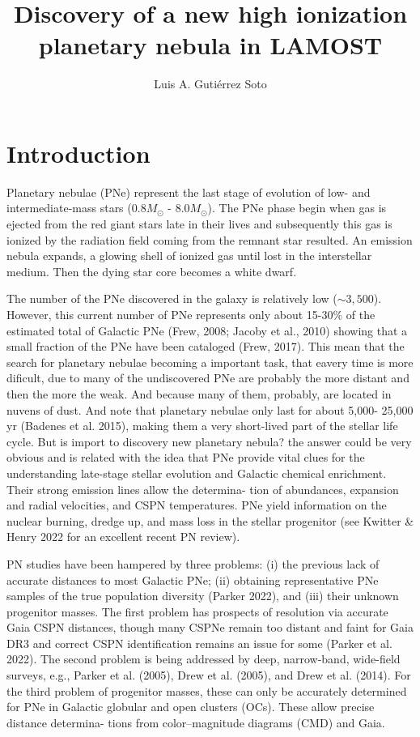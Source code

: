 \documentclass{article}
\title{Discovery of a new high  ionization planetary nebula in LAMOST}
\author{Luis A. Gutiérrez Soto     
}
\newcommand\msol{M_\odot}
\begin{document}
\maketitle

\section{Introduction}
\label{sec:intro}

Planetary nebulae (PNe) represent the last stage of evolution of low- and intermediate-mass stars (0.8$\msol$ - 8.0$\msol$). The PNe phase begin when gas is ejected from the red giant stars late in their lives and subsequently this gas is ionized by the radiation field coming from the remnant star resulted. An emission nebula expands, a glowing shell of ionized gas until lost in the interstellar medium. Then the dying star core becomes a white dwarf.

The number of the PNe discovered in the galaxy is relatively low (\(\sim 3,500\)). However, this current number of PNe represents only about 15-30\% of the estimated
total of Galactic PNe (Frew, 2008; Jacoby et al., 2010) showing that a small fraction
of the PNe have been cataloged (Frew, 2017). This mean that the search for planetary nebulae becoming a important task, that eavery time is more dificult, due to many of the undiscovered PNe are probably
the more distant and then the more the weak. And because many of them, probably, are located in nuvens of dust. And note that planetary nebulae only last for about 5,000-
25,000 yr (Badenes et al. 2015), making them a very short-lived part of the stellar life cycle.
But is import to discovery new planetary nebula? the answer could be very obvious and is related with the idea that PNe provide vital clues for the understanding late-stage stellar evolution and Galactic chemical enrichment. Their strong emission lines allow the determina-
tion of abundances, expansion and radial velocities, and
CSPN temperatures. PNe yield information on the nuclear
burning, dredge up, and mass loss in the stellar progenitor
(see Kwitter & Henry 2022 for an excellent recent PN
review).

PN studies have been hampered by three problems:
(i) the previous lack of accurate distances to most Galactic
PNe; (ii) obtaining representative PNe samples of the true
population diversity (Parker 2022), and (iii) their unknown
progenitor masses. The first problem has prospects of
resolution via accurate Gaia CSPN distances, though many
CSPNe remain too distant and faint for Gaia DR3 and correct
CSPN identification remains an issue for some (Parker et al.
2022). The second problem is being addressed by deep, narrow-band, wide-field surveys, e.g., Parker et al. (2005),
Drew et al. (2005), and Drew et al. (2014). For the third problem of progenitor masses, these can only
be accurately determined for PNe in Galactic globular and
open clusters (OCs). These allow precise distance determina-
tions from color–magnitude diagrams (CMD) and Gaia.
\end{document}

